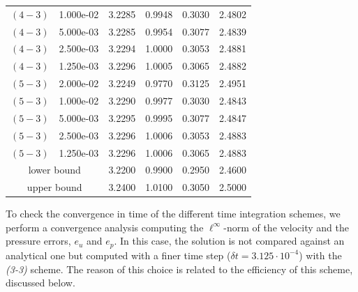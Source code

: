 \begin{table}[h!]
\begin{tabular} {cccccc}
			$(4-3)$ & 1.000e-02 & 3.2285 & 0.9948 & 0.3030 & 2.4802 \\ 
			$(4-3)$ & 5.000e-03 & 3.2285 & 0.9954 & 0.3077 & 2.4839 \\ 
			$(4-3)$ & 2.500e-03 & 3.2294 & 1.0000 & 0.3053 & 2.4881 \\ 
			$(4-3)$ & 1.250e-03 & 3.2296 & 1.0005 & 0.3065 & 2.4882 \\ 
		\midrule
			$(5-3)$ & 2.000e-02 & 3.2249 & 0.9770 & 0.3125 & 2.4951 \\ 
			$(5-3)$ & 1.000e-02 & 3.2290 & 0.9977 & 0.3030 & 2.4843 \\ 
			$(5-3)$ & 5.000e-03 & 3.2295 & 0.9995 & 0.3077 & 2.4847 \\ 
			$(5-3)$ & 2.500e-03 & 3.2296 & 1.0006 & 0.3053 & 2.4883 \\ 
			$(5-3)$ & 1.250e-03 & 3.2296 & 1.0006 & 0.3065 & 2.4883 \\ 
		\midrule
		\midrule
			\multicolumn{2}{c}{lower bound} & 3.2200 & 0.9900 & 0.2950 & 2.4600 \\
			\multicolumn{2}{c}{upper bound} & 3.2400 & 1.0100 & 0.3050 & 2.5000 \\
		\bottomrule
	\end{tabular}
\end{table}

To check the convergence in time of the different time integration schemes, we perform a convergence analysis computing the $\ell^\infty$-norm of the velocity and the pressure errors, $e_u$ and $e_p$. In this case, the solution is not compared against an analytical one but computed with a finer time step ($\delta t=3.125\cdot10^{-4}$) with the \textit{(3-3)} scheme. The reason of this choice is related to the efficiency of this scheme, discussed below.

